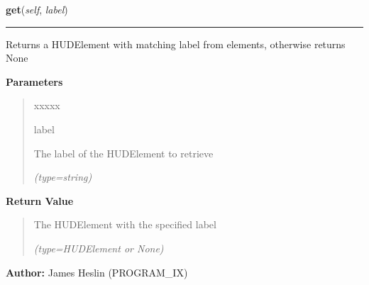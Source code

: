     \label{pystroke:hud:HUD:get}

    \vspace{0.5ex}

\hspace{.8\funcindent}\begin{boxedminipage}{\funcwidth}

    \raggedright \textbf{get}(\textit{self}, \textit{label})

    \vspace{-1.5ex}

    \rule{\textwidth}{0.5\fboxrule}
\setlength{\parskip}{2ex}
    Returns a HUDElement with matching label from elements, otherwise 
    returns None

\setlength{\parskip}{1ex}
      \textbf{Parameters}
      \vspace{-1ex}

      \begin{quote}
        \begin{Ventry}{xxxxx}

          \item[label]

          The label of the HUDElement to retrieve

            {\it (type=string)}

        \end{Ventry}

      \end{quote}

      \textbf{Return Value}
    \vspace{-1ex}

      \begin{quote}
      The HUDElement with the specified label

      {\it (type=HUDElement or None)}

      \end{quote}

\textbf{Author:} James Heslin (PROGRAM\_IX)



    \end{boxedminipage}

